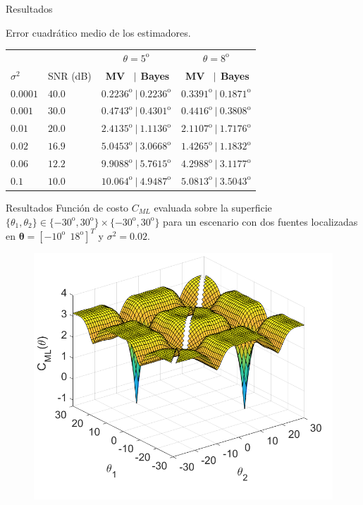 \documentclass[12pt,aspectratio=169]{beamer}
\begin{document}
	\begin{frame}{Resultados}
		\begin{table}[H]
			Error cuadrático medio de los estimadores.
			\vspace{5mm}
			\begin{center}
				\begin{tabular}{|l|l||c|c|}
					\hline  && $\theta = 5^{\mathrm{o}}$ & $\theta = 8^{\mathrm{o}}$ \\ 
					\cline{3-4}
					$\sigma^2$&SNR (dB)& $~$\textbf{MV}$~~~~|~~$\textbf{Bayes} & $~$\textbf{MV}$~~~~|~~$\textbf{Bayes} \\ 
					\hline \hline 
					$0$.$0001$ &$40$.$0$& $0$.$2236^{\mathrm{o}}~|~0$.$2236^{\mathrm{o}}$ & $0$.$3391^{\mathrm{o}}~|~0$.$1871^{\mathrm{o}}$ \\
					\hline 
					$0$.$001$ &$30$.$0$& $0$.$4743^{\mathrm{o}}~|~0$.$4301^{\mathrm{o}}$ & $0$.$4416^{\mathrm{o}}~|~0$.$3808^{\mathrm{o}}$ \\
					\hline 
					$0$.$01$ &$20$.$0$& $2$.$4135^{\mathrm{o}}~|~1$.$1136^{\mathrm{o}}$ & $2$.$1107^{\mathrm{o}}~|~1$.$7176^{\mathrm{o}}$ \\
					\hline
					$0$.$02$ &$16$.$9$& $5$.$0453^{\mathrm{o}}~|~3$.$0668^{\mathrm{o}}$ & $1$.$4265^{\mathrm{o}}~|~1$.$1832^{\mathrm{o}}$ \\
					\hline 
					$0$.$06$ &$12$.$2$& $9$.$9088^{\mathrm{o}}~|~5$.$7615^{\mathrm{o}}$ & $4$.$2988^{\mathrm{o}}~|~3$.$1177^{\mathrm{o}}$ \\
					\hline 
					$0$.$1$ &$10$.$0$& $10$.$064^{\mathrm{o}}~|~4$.$9487^{\mathrm{o}}$ & $5$.$0813^{\mathrm{o}}~|~3$.$5043^{\mathrm{o}}$ \\
					\hline 									 			
				\end{tabular}
			\end{center}
		\end{table}
	\end{frame}
	
	\begin{frame}{Resultados}
		Función de costo $C_{ML}$ evaluada sobre la superficie $\{\theta_1,\theta_2\} \in \{-30^{\mathrm{o}}, 30^{\mathrm{o}}\}\times\{-30^{\mathrm{o}}, 30^{\mathrm{o}}\}$ para un escenario con dos fuentes localizadas en $\pmb{\theta} = [-10^{\mathrm{o}}~~18^{\mathrm{o}}]^T$ y $\sigma^2 = 0$.$02$.
		\begin{figure}[h]
			\centering
			\includegraphics[width=0.52\linewidth]{figures/Fig3a.png}
		\end{figure}
	\end{frame}
	
\end{document}
